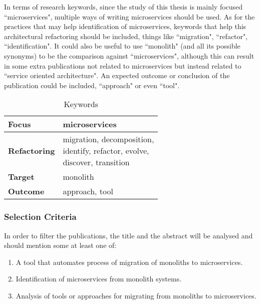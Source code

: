\documentclass[conference]{IEEEtran}
\newcommand{\wrap}[1]{\parbox{.33\linewidth}{\vspace{1.5mm}#1\vspace{1mm}}}
\begin{document}
In terms of research keywords, since the study of this thesis is mainly
focused ``microservices", multiple ways of writing microservices should be
used. As for the practices that may help identification of microservices,
keywords that help this architectural refactoring should be included, things
like ``migration", ``refactor", ``identification". It could also be useful to
use ``monolith" (and all its possible synonyms) to be the comparison against
``microservices", although this can result in some extra publications not
related to microservices but instead related to ``service oriented
architecture". An expected outcome or conclusion of the publication could be
included, ``approach" or even ``tool".

\begin{table}[H] \caption{Keywords} \label{tab:keywords}
  \begin{center}
    \begin{tabular}[c]{l|l} {\textbf{Focus}} & microservices \\
      \hline \textbf{Refactoring} & {\wrap{ migration, decomposition,\\
          identify, refactor, evolve,\\
      discover, transition }} \\
      \hline \textbf{Target} & monolith \\
      \hline \textbf{Outcome} & approach, tool \\
    \end{tabular}
  \end{center}
\end{table}


\subsubsection{Selection Criteria} \label{sub:selection-criteria}

In order to filter the publications, the title and the abstract will be
analysed and should mention some at least one of:

\begin{enumerate}[{IC}1.]
  \item A tool that automates process of migration of monoliths to
    microservices.
  \item Identification of microservices from monolith systems.
  \item Analysis of tools or approaches for migrating from monoliths to
    microservices.
\end{enumerate}
\end{document}
